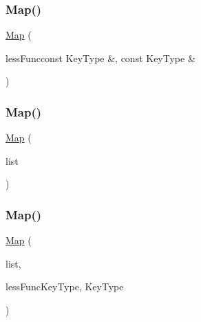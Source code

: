 \mbox{\label{classMap_a0f8061a4d1a8b6cc2a005d457f7f99d0}} 
\subsubsection{\texorpdfstring{Map()}{Map()}\hspace{0.1cm}{\footnotesize\ttfamily [3/8]}}
{\footnotesize\ttfamily \mbox{\hyperlink{classMap}{Map}} (\begin{DoxyParamCaption}\item[{bool }]{less\+Funcconst Key\+Type \&, const Key\+Type \& }\end{DoxyParamCaption})}

\mbox{\label{classMap_a3c4b56834747c9afec2e1d843348c7a9}} 
\subsubsection{\texorpdfstring{Map()}{Map()}\hspace{0.1cm}{\footnotesize\ttfamily [4/8]}}
{\footnotesize\ttfamily \mbox{\hyperlink{classMap}{Map}} (\begin{DoxyParamCaption}\item[{std\+::initializer\+\_\+list$<$ std\+::pair$<$ Key\+Type, Value\+Type $>$ $>$}]{list }\end{DoxyParamCaption})}

\mbox{\label{classMap_a1015ca1e803c78ab7fd4414bd4d58888}} 
\subsubsection{\texorpdfstring{Map()}{Map()}\hspace{0.1cm}{\footnotesize\ttfamily [5/8]}}
{\footnotesize\ttfamily \mbox{\hyperlink{classMap}{Map}} (\begin{DoxyParamCaption}\item[{std\+::initializer\+\_\+list$<$ std\+::pair$<$ Key\+Type, Value\+Type $>$ $>$}]{list,  }\item[{bool }]{less\+FuncKey\+Type, Key\+Type }\end{DoxyParamCaption})}

\mbox{\label{classMap_af04ed5af861a0358b240f8dbd5b3ac77}} 
